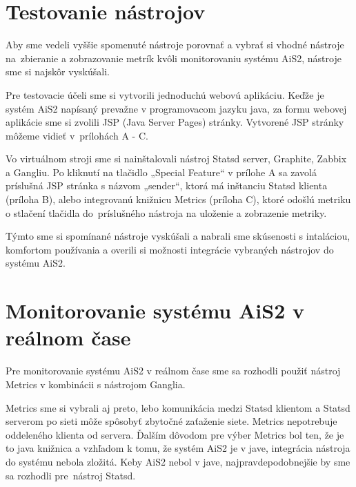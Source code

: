 \documentclass[a4paper, upjsfrontpage, disablespecwarning, thesismargins, thesislinespacing]{rnthesis}
\begin{document}
\section{Testovanie nástrojov}

Aby sme vedeli vyššie spomenuté nástroje porovnať a vybrať si vhodné nástroje na~zbieranie a zobrazovanie metrík kvôli monitorovaniu systému AiS2, nástroje sme si najskôr vyskúšali.

Pre testovacie účeli sme si vytvorili jednoduchú webovú aplikáciu.
Keďže je systém AiS2 napísaný prevažne v programovacom jazyku java, za formu webovej aplikácie sme si zvolili JSP (Java Server Pages) stránky.
Vytvorené JSP stránky môžeme vidieť v~prílohách A - C.

Vo virtuálnom stroji sme si nainštalovali nástroj Statsd server, Graphite, Zabbix a Gangliu.
Po kliknutí na tlačidlo „Special Feature“ v prílohe A sa zavolá príslušná JSP stránka s názvom „sender“, ktorá má inštanciu Statsd klienta (príloha B), alebo integrovanú knižnicu Metrics (príloha C), ktoré odošlú metriku o stlačení tlačidla do~príslušného nástroja na uloženie a zobrazenie metriky.

Týmto sme si spomínané nástroje vyskúšali a nabrali sme skúsenosti s intaláciou, komfortom používania a overili si možnosti integrácie vybraných nástrojov do systému AiS2.



\section{Monitorovanie systému AiS2 v reálnom čase}

Pre monitorovanie systému AiS2 v reálnom čase sme sa rozhodli použiť nástroj Metrics v kombinácii s nástrojom Ganglia.

Metrics sme si vybrali aj preto, lebo komunikácia medzi Statsd klientom a Statsd serverom po sieti môže spôsobyť zbytočné zaťaženie siete.
Metrics nepotrebuje oddeleného klienta od servera.
Ďalším dôvodom pre výber Metrics bol ten, že je to java knižnica a vzhľadom k tomu, že systém AiS2 je v jave, integrácia nástroja do systému nebola zložitá.
Keby AiS2 nebol v jave, najpravdepodobnejšie by sme sa rozhodli pre~nástroj Statsd.
\end{document}
